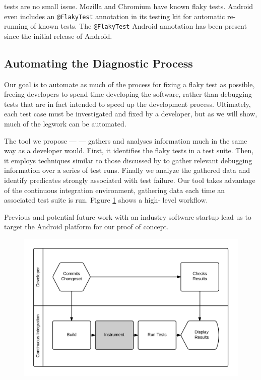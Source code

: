 \Flaky tests are no small issue. Mozilla\cite{mozillaFlakyTestBug} and Chromium
have known flaky tests. Android even includes an {\tt @FlakyTest}
annotation\cite{androidFlakyInterface} in its testing kit for automatic re-
running of known \flaky tests. The {\tt @FlakyTest} Android annotation has been
present since the initial release of Android.


\subsection{Automating the Diagnostic Process}

Our goal is to automate as much of the process for fixing a flaky test as
possible, freeing developers to spend time developing the software, rather than
debugging tests that are in fact intended to speed up the development process.
Ultimately, each test case must be investigated and fixed by a developer, but as
we will show, much of the legwork can be automated.

The tool we propose --- \textit{\venera} --- gathers and analyses information
much in the same way as a developer would. First, it identifies the flaky tests
in a test suite. Then, it employs techniques similar to those discussed by
\citet{ArumugaNainar:2010:ABI:1806799.1806839} to gather relevant debugging
information over a series of test runs. Finally we analyze the gathered data and
identify predicates strongly associated with test failure. Our tool takes
advantage of the continuous integration environment, gathering data each time an
associated test suite is run. Figure \ref{fig:developer_workflow} shows a high-
level \venera workflow.

Previous and potential future work with an industry software startup lead us to
target the Android platform for our proof of concept.

\begin{figure}[h]

\includegraphics[width=\linewidth]{Images/developer_workflow}

\caption{}
\label{fig:developer_workflow}
\end{figure}

